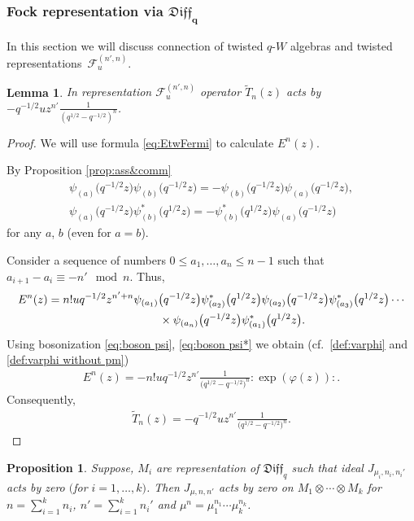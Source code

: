 \documentclass[pdftex]{sigma}
\numberwithin{equation}{section}
\newtheorem{Proposition}[Theorem]{Proposition}
\newtheorem{Lemma}[Theorem]{Lemma}
\theoremstyle{definition}
\newcommand{\qD}{\mathfrak{Diff}_q}
\newcommand{\psia}{\psi_{({a})}}
\newcommand{\psib}{\psi^*_{( b )}}
\newcommand{\psibb}{\psi_{( b )}}
\newcommand{\T}{\tilde{T}}
\begin{document}
\subsubsection[Fock representation via $\qD$]{Fock representation via $\boldsymbol{\qD}$}
In this section we will discuss connection of twisted $q$-$W$ algebras and twisted representa\-tions~$\mathcal{F}_u^{(n',n)}$.
\begin{Lemma} \label{lemma:T_n for twFock}
In representation $\mathcal{F}_u^{(n',n)}$ operator $\T_n(z)$ acts by $-q^{-1/2} u z^{n'} \frac{1}{(q^{1/2} - q^{-1/2})^n}$.
\end{Lemma}

\begin{proof}We will use formula \eqref{eq:EtwFermi} to calculate $E^n(z)$.

By Proposition \ref{prop:ass&comm}
\begin{gather*}
\psia\big(q^{-1/2} z\big) \psibb \big(q^{-1/2} z\big) = - \psibb \big(q^{-1/2} z\big) \psia\big(q^{-1/2} z\big),\\
\psia \big(q^{-1/2} z\big) \psib \big(q^{1/2}z\big)= - \psib \big(q^{1/2}z\big) \psia \big(q^{-1/2} z\big)
\end{gather*}
for any $a$, $b$ (even for $a=b$).

Consider a sequence of numbers $0 \leqslant a_1, \dots, a_n \leqslant n-1$ such that $a_{i+1} - a_i \equiv -n' \mod{n}$. Thus,
\begin{gather*}
E^n(z) = n! u q^{-1/2} z^{n' + n} \psi_{(a_1)} \big(q^{-1/2} z\big) \psi^*_{(a_2)} \big(q^{1/2}z\big) \psi_{(a_2)} \big(q^{-1/2} z\big) \psi^*_{(a_3)} \big(q^{1/2}z\big)\cdots\\
\hphantom{E^n(z) =}{}\times \psi_{(a_n)} \big(q^{-1/2} z\big) \psi^*_{(a_1)} \big(q^{1/2}z\big).
\end{gather*}
Using bosonization \eqref{eq:boson psi}, \eqref{eq:boson psi*} we obtain (cf.\ \eqref{def:varphi} and \eqref{def:varphi without pm})
\begin{gather*}
E^n(z) = - n! u q^{-1/2} z^{n'} \frac{1}{\big(q^{1/2} - q^{-1/2}\big)^n} : \! \exp ( \varphi(z) ) \! :.
\end{gather*}
Consequently,
\begin{gather*}
\T_n (z) = - q^{-1/2} u z^{n'} \frac{1}{\big(q^{1/2} - q^{-1/2}\big)^n}.\tag*{\qed}
\end{gather*}\renewcommand{\qed}{}
\end{proof}
\begin{Proposition} \label{prop:tensorIDEAL}
Suppose, $M_i$ are representation of $\qD$ such that ideal $J_{\mu_i, n_i, n_i'}$ acts by zero $($for $i=1, \dots, k)$. Then $J_{\mu, n, n'}$ acts by zero on $M_1 \otimes \cdots \otimes M_k$ for $n = \sum\limits_{i=1}^k n_i$, $n'= \sum\limits_{i=1}^k n_i'$ and $\mu^{n} = \mu_1^{n_1} \cdots \mu_k^{n_k}$.
\end{Proposition}
\end{document}
